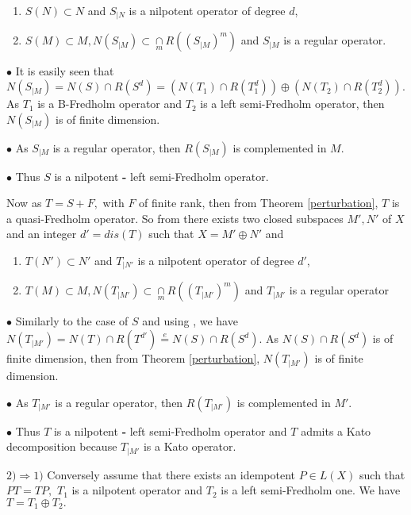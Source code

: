 \documentclass[10pt]{article}
\numberwithin{equation}{section}
\begin{document}
\begin{enumerate}
\item $S(N)\subset N $  and  $ S_{\mid N}$ is a  nilpotent operator of degree $d$,
\item $ S(M) \subset M,     
 N(S_{\mid M })  \subset \underset{m} \cap R( (S_{\mid M })^m)  $  and $S_{\mid M }$ is a regular operator.
\end{enumerate}

$\bullet$ It is easily seen that  $ N(S_{\mid M })= N(S)\cap R(S^d)= (N(T_1)\cap R(T_1^d)) \oplus (N(T_2)\cap R(T_2^d)).$  
As $T_1$ is a B-Fredholm operator and $ T_2$ is a left semi-Fredholm operator, then $ N(S_{\mid M })$ is of finite dimension.

$\bullet$ As $S_{\mid M }$ is a regular operator, then $R(S_{\mid M })$ is complemented in $M.$ 

$\bullet$ Thus $S$ is a nilpotent \textbf{-} left semi-Fredholm operator. 

Now as $ T= S+ F,$ with $F$ of finite rank, then from Theorem \ref{perturbation},   $ T$ is a quasi-Fredholm operator. So from  \cite[Th\'eor\'eme 3.2.2]{LAB}   there exists two closed
subspaces  $M',  N'$  of $ X $ and an integer $d'= dis(T)$ such that   $ X = M'\oplus N' $  and

\begin{enumerate}
\item $T(N')\subset N' $  and  $ T_{\mid N'}$ is a  nilpotent operator of degree $d'$,
\item $ T(M) \subset M,  
 N(T_{\mid M' })  \subset \underset{m} \cap R( (T_{\mid M' })^m)  $  and $T_{\mid M' }$ is a regular operator 
\end{enumerate}

$\bullet$ Similarly to the case of $S$ and using \cite{KMMP},  we  have $ N(T_{\mid M' })= N(T)\cap R(T^{d'})\overset{e}{=} N(S)\cap R(S^d).$ As  $N(S)\cap R(S^d)$  is of finite dimension,  then from Theorem \ref{perturbation}, $ N(T_{\mid M' })$ is of finite dimension.

$\bullet$ As $T_{\mid M' }$ is a regular operator, then $R(T_{\mid M' })$ is complemented in $M'.$ 

$\bullet$ Thus $T$ is a nilpotent \textbf{-} left semi-Fredholm operator and $T$ admits a Kato decomposition because $T_{\mid M' }$ is a Kato operator. 






$ 2)\Rightarrow 1)$ Conversely assume that there exists an idempotent $P \in L(X)$ such that $PT= TP,$   $T_1 $ is a  nilpotent  operator  and  $T_2$ is a left semi-Fredholm one. We have $ T= T_1 \oplus T_2.$ 
\end{document}
